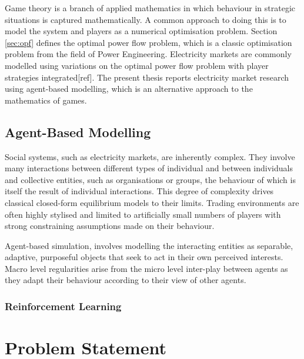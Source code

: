Game theory is a branch of applied mathematics in which behaviour in strategic
situations is captured mathematically.  A common approach to doing this is to
model the system and players as a numerical optimisation problem.  Section
\ref{sec:opf} defines the optimal power flow problem, which is a classic
optimisation problem from the field of Power Engineering.  Electricity markets
are commonly modelled using variations on the optimal power flow problem with
player strategies integrated[ref].  The present thesis reports electricity
market research using agent-based modelling, which is an alternative approach
to the mathematics of games.

\subsection{Agent-Based Modelling}
Social systems, such as electricity markets, are inherently complex.  They
involve many interactions between different types of individual and between
individuals and collective entities, such as organisations or groups, the
behaviour of which is itself the result of individual interactions.  This
degree of complexity drives classical closed-form equilibrium models to their
limits.  Trading environments are often highly stylised and limited to
artificially small numbers of players with strong constraining assumptions
made on their behaviour.

Agent-based simulation, involves modelling the interacting entities as
separable, adaptive, purposeful objects that seek to act in their own perceived
interests.  Macro level regularities arise from the micro level inter-play
between agents as they adapt their behaviour according to their view of other
agents.

\subsubsection{Reinforcement Learning}

\section{Problem Statement}%

